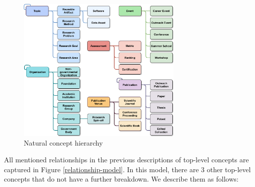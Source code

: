 \begin{figure}
\centering
\includegraphics[width=8cm]{figures/natural-concept-hierarchy.eps}
\caption{Natural concept hierarchy} \label{natural-concept-hierarchy}
\end{figure}


All mentioned relationships in the previous descriptions of top-level concepts are captured in Figure \ref{relationship-model}. In this model, there are 3 other top-level concepts that do not have a further breakdown. We describe them as follows:


